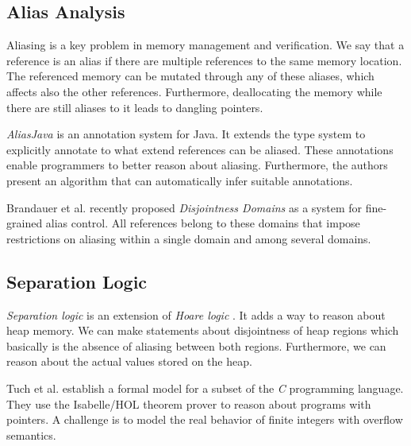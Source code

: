 \subsection{Alias Analysis}
Aliasing is a key problem in memory management and verification.
We say that a reference is an alias if there are multiple references to the same memory location.
The referenced memory can be mutated through any of these aliases, which affects also the other references.
Furthermore, deallocating the memory while there are still aliases to it leads to dangling pointers.

\emph{AliasJava} \cite{Aldrich:2002:AAP:582419.582448} is an annotation system for Java.
It extends the type system to explicitly annotate to what extend references can be aliased.
These annotations enable programmers to better reason about aliasing.
Furthermore, the authors present an algorithm that can automatically infer suitable annotations.

Brandauer et al. \cite{Brandauer:2015:DDF:2814270.2814280} recently proposed \emph{Disjointness Domains} as a system for fine-grained alias control.
All references belong to these domains that impose restrictions on aliasing within a single domain and among several domains.


\subsection{Separation Logic}
\emph{Separation logic} \cite{reynolds2002separation} is an extension of \emph{Hoare logic} \cite{Hoare:1969:ABC:363235.363259}.
It adds a way to reason about heap memory.
We can make statements about disjointness of heap regions which basically is the absence of aliasing between both regions.
Furthermore, we can reason about the actual values stored on the heap.

Tuch et al. \cite{Tuch:2007:TBS:1190216.1190234} establish a formal model for a subset of the \emph{C} programming language.
They use the Isabelle/HOL theorem prover to reason about programs with pointers.
A challenge is to model the real behavior of finite integers with overflow semantics.
